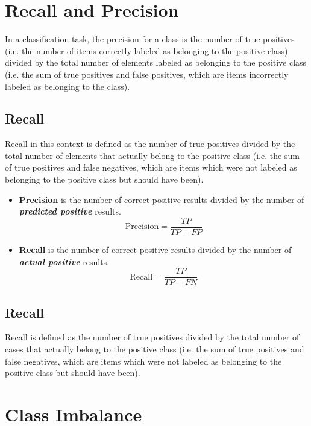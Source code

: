 \documentclass[a4paper,12pt]{article}
\begin{document}
\section{Recall and Precision}
In a classification task, the precision for a class is the number of true positives (i.e. the number of items correctly labeled as belonging to the positive class) divided by the total number of elements labeled as belonging to the positive class (i.e. the sum of true positives and false positives, which are items incorrectly labeled as belonging to the class). 


\subsection*{Recall}
Recall in this context is defined as the number of true positives divided by the total number of elements that actually belong to the positive class (i.e. the sum of true positives and false negatives, which are items which were not labeled as belonging to the positive class but should have been).
\begin{itemize}
	\item \textbf{Precision} is the number of correct positive results divided by the number of \textit{\textbf{predicted positive}} results.
	\[ \mbox{Precision}= \frac{TP}{TP+FP}  \]
	\item \textbf{Recall} is the number of correct positive results divided by the number of \textit{\textbf{actual positive}} results. 
	\[ \mbox{Recall}= \frac{TP}{TP+FN}  \]
\end{itemize}

\subsection{Recall}
Recall is defined as the number of true positives divided by the total number of cases that actually
belong to the positive class (i.e. the sum of true positives and false negatives, which are items
which were not labeled as belonging to the positive class but should have been).


\newpage
\section{Class Imbalance}
\end{document}
